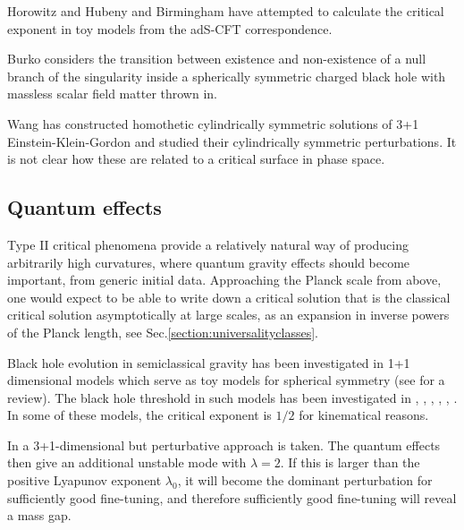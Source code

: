 \documentclass{article}
\begin{document}
Horowitz and Hubeny \cite{HorowitzHubeny} and Birmingham
\cite{BirminghamAdS} have attempted to calculate the critical exponent
in toy models from the adS-CFT correspondence.

Burko \cite{Burko3} considers the transition between existence and
non-existence of a null branch of the singularity inside a spherically
symmetric charged black hole with massless scalar field matter thrown
in.

Wang \cite{WangCylindrical} has constructed homothetic cylindrically
symmetric solutions of 3+1 Einstein-Klein-Gordon and studied their
cylindrically symmetric perturbations. It is not clear how these
are related to a critical surface in phase space.


\subsection{Quantum effects}

Type II critical phenomena provide a relatively natural way of
producing arbitrarily high curvatures, where quantum gravity effects
should become important, from generic initial data. Approaching the
Planck scale from above, one would expect to be able to write down a
critical solution that is the classical critical solution
asymptotically at large scales, as an expansion in inverse powers of
the Planck length, see Sec.\ref{section:universalityclasses}.

Black hole evolution in semiclassical gravity has been investigated in
1+1 dimensional models which serve as toy models for spherical
symmetry (see \cite{Giddings_BH} for a review). The black hole
threshold in such models has been investigated in \cite{ChibaSiino},
\cite{AyalPiran}, \cite{StromingerThorlacius}, \cite{Kiem},
\cite{ZhouKirstenYang}, \cite{PelegBoseParker,BoseParkerPeleg}. In some
of these models, the critical exponent is $1/2$ for kinematical reasons.

In \cite{BradyOttewill} a 3+1-dimensional but perturbative approach is
taken. The quantum effects then give an additional unstable mode with
$\lambda=2$. If this is larger than the positive Lyapunov exponent
$\lambda_0$, it will become the dominant perturbation for sufficiently
good fine-tuning, and therefore sufficiently good fine-tuning will
reveal a mass gap.


\end{document}
